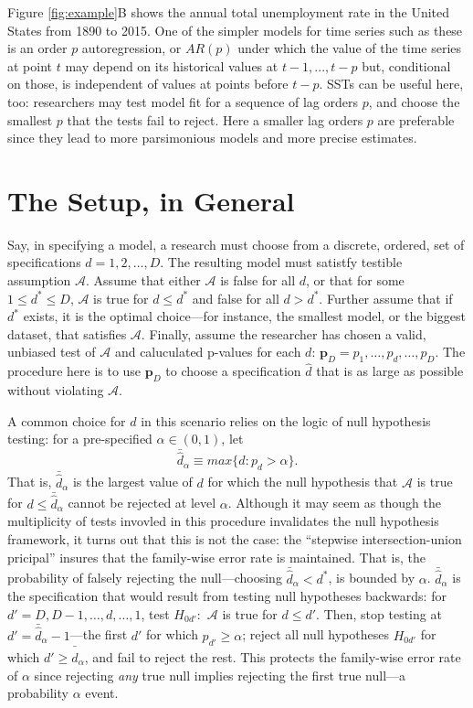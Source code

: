 \documentclass[12pt]{article}\usepackage[]{graphicx}\usepackage[]{color}
\newcommand{\dalphaU}{\bar{\hat{d}}_\alpha}
\newcommand{\dstar}{d^*}
\begin{document}
Figure \ref{fig:example}B shows the annual total unemployment rate in the
United States from 1890 to 2015.
One of the simpler models for time series such as these is an order
$p$ autoregression, or $AR(p)$ under which the value of the time
series at point $t$ may depend on its historical values at
$t-1,...,t-p$ but, conditional on those, is independent of values at
points before $t-p$.
SSTs can be useful here, too: researchers may test model fit for a
sequence of lag orders $p$, and choose the smallest $p$ that the tests
fail to reject.
Here a smaller lag orders $p$ are preferable since they lead to more
parsimonious models and more precise estimates.



\section{The Setup, in General}

Say, in specifying a model, a research must choose from a discrete,
ordered, set of specifications $d=1,2,\dots,D$.
The resulting model must satistfy testible assumption $\mathcal{A}$.
Assume that either $\mathcal{A}$ is false for all $d$, or that for
some $1\le \dstar\le D$, $\mathcal{A}$ is true for $d\le \dstar$ and false
for all $d>\dstar$.
Further assume that if $\dstar$ exists, it is the optimal choice---for
instance, the smallest model, or the biggest dataset, that satisfies
$\mathcal{A}$.
Finally, assume the researcher has chosen a valid, unbiased test of
$\mathcal{A}$ and caluculated p-values for each $d$:
$\bm{p}_D=p_1,\dots,p_d,\dots,p_D$.
The procedure here is to use $\bm{p}_D$ to choose a specification
$\hat{d}$ that is as large as possible without violating
$\mathcal{A}$.


A common choice for $d$ in this scenario relies on the logic of null
hypothesis testing: for a pre-specified $\alpha \in (0,1)$, let
\begin{equation*}
\dalphaU \equiv max\{d : p_d>\alpha\}.
\end{equation*}
That is, $\dalphaU$ is the largest value of $d$ for which the
null hypothesis that $\mathcal{A}$ is true for $d\le \dalphaU$
cannot be rejected at level $\alpha$.
Although it may seem as though the multiplicity of tests invovled in
this procedure invalidates the null hypothesis framework, it turns out
that this is not the case: the ``stepwise intersection-union
pricipal'' \citet{berger1988, rosenbaum2008,hansen2015} insures that the
family-wise error rate is maintained.
That is, the probability of falsely rejecting the null---choosing
$\dalphaU<\dstar$, is bounded by $\alpha$.
$\dalphaU$ is the specification that would result from testing null
hypotheses backwards: for $d'=D,D-1,\dots,d,\dots,1$, test $H_{0d'}:$
$\mathcal{A}$ is true for $d\le d'$.
Then, stop testing at $d'=\dalphaU -1$---the first $d'$ for which
$p_{d'} \ge \alpha$; reject all null hypotheses $H_{0d'}$ for which
$d'\ge \dalphaU$, and fail to reject the rest.
This protects the family-wise error rate of $\alpha$ since rejecting
\emph{any} true null implies rejecting the first true null---a
probability $\alpha$ event.
\end{document}
